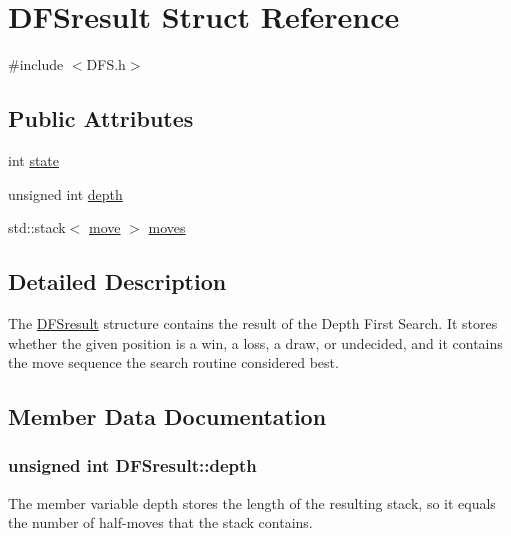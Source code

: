 \hypertarget{structDFSresult}{}\section{D\+F\+Sresult Struct Reference}
\label{structDFSresult}


{\ttfamily \#include $<$D\+F\+S.\+h$>$}

\subsection*{Public Attributes}
\begin{DoxyCompactItemize}
\item 
int \hyperlink{structDFSresult_a05517437c3e1db1f5b212f2862801b85}{state}
\item 
unsigned int \hyperlink{structDFSresult_a0d91b41c51df56f42e450f9ce82fa4f2}{depth}
\item 
std\+::stack$<$ \hyperlink{structmove}{move} $>$ \hyperlink{structDFSresult_acbab901f87df79e0ff718f4fd9435a0f}{moves}
\end{DoxyCompactItemize}


\subsection{Detailed Description}
The \hyperlink{structDFSresult}{D\+F\+Sresult} structure contains the result of the Depth First Search. It stores whether the given position is a win, a loss, a draw, or undecided, and it contains the move sequence the search routine considered best. 

\subsection{Member Data Documentation}
\subsubsection[{\texorpdfstring{depth}{depth}}]{\setlength{\rightskip}{0pt plus 5cm}unsigned int D\+F\+Sresult\+::depth}\hypertarget{structDFSresult_a0d91b41c51df56f42e450f9ce82fa4f2}{}\label{structDFSresult_a0d91b41c51df56f42e450f9ce82fa4f2}
The member variable depth stores the length of the resulting stack, so it equals the number of half-\/moves that the stack contains. 

